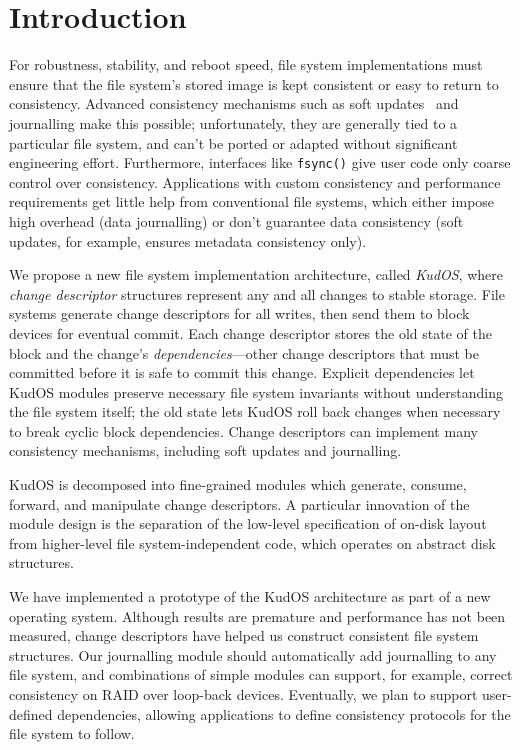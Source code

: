 
\section*{Introduction}
\label{sec:intro}

For robustness, stability, and reboot speed, file system implementations
must ensure that the file system's stored image is kept consistent
or easy to return to consistency.
%
Advanced consistency mechanisms such as soft updates~\cite{ganger00soft}
and journalling make this possible; unfortunately,
%
they are generally tied to a particular file system, and
can't be ported or adapted without significant engineering
effort.
%
Furthermore, interfaces like \verb+fsync()+ give user code only coarse
control over consistency.
%
Applications with custom consistency and performance requirements get
little help from conventional file systems, which either impose high
overhead (data journalling) or don't guarantee data consistency (soft
updates, for example, ensures metadata consistency only).



We propose a new file system implementation architecture, called
\emph{KudOS},
%
where \emph{change descriptor} structures represent any and all changes to
stable storage.
%
File systems generate change descriptors for all writes, then
send them to block devices for eventual commit.
%
Each change descriptor stores the old state of the block and the change's
\emph{dependencies}---other change descriptors that must be committed before
it is safe to commit this change.
%
Explicit dependencies let KudOS modules preserve necessary file system
invariants without understanding the file system itself; the old state
lets KudOS roll back changes when necessary to break cyclic block dependencies.
%
Change descriptors can implement many
consistency mechanisms, including soft updates and journalling.

KudOS is decomposed into fine-grained modules which generate, consume,
forward, and manipulate change descriptors. A particular innovation of the
module design is the separation of the low-level specification of on-disk layout
from higher-level file system-independent code, which operates on abstract disk
structures.

We have implemented a prototype of the KudOS
architecture as part of a new operating system.
%
Although results are premature and performance has not been measured,
change descriptors have helped us construct consistent file
system structures.
%
Our journalling module should automatically add journalling to any file
system, and combinations of simple modules can support, for example,
correct consistency on RAID over loop-back devices.
%
Eventually, we plan to support user-defined dependencies,
allowing applications to define consistency protocols for the file system
to follow.


